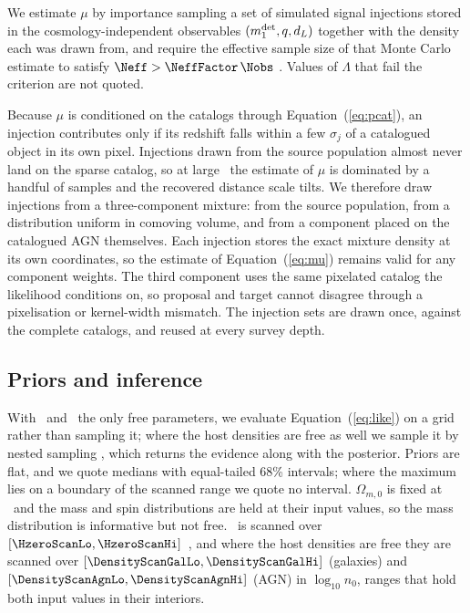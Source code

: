 We estimate $\mu$ by importance sampling a set of simulated signal injections
stored in the cosmology-independent observables
$(m_1^{\rm det}, q, d_L)$ together with the density each was drawn from, and
require the effective sample size of that Monte Carlo estimate to satisfy
$\Neff > \NeffFactor\,\Nobs$ \citep{Farr2019}. Values of $\Lambda$ that fail
the criterion are not quoted.

Because $\mu$ is conditioned on the catalogs through Equation~(\ref{eq:pcat}),
an injection contributes only if its redshift falls within a few $\sigma_j$ of
a catalogued object in its own pixel. Injections drawn from the source
population almost never land on the sparse catalog, so at large \fagn\ the
estimate of $\mu$ is dominated by a handful of samples and the recovered
distance scale tilts. We therefore draw injections from a three-component
mixture: from the source population, from a distribution uniform in comoving
volume, and from a component placed on the catalogued AGN themselves. Each
injection stores the exact mixture density at its own coordinates, so the
estimate of Equation~(\ref{eq:mu}) remains valid for any component weights. The
third component uses the same pixelated catalog the likelihood
conditions on, so proposal and target cannot disagree through a pixelisation or
kernel-width mismatch. The injection sets are drawn once, against the
complete catalogs, and reused at every survey depth.

\subsection{Priors and inference}
\label{sec:methods:inference}

With \Hz\ and \fagn\ the only free parameters, we evaluate
Equation~(\ref{eq:like}) on a grid rather than sampling it; where the host
densities are free as well we sample it by nested sampling
\citep{Speagle2020}, which returns the evidence along with the posterior. Priors are flat, and
we quote medians with equal-tailed 68\% intervals; where the maximum lies on a
boundary of the scanned range we quote no interval. $\Omega_{m,0}$ is fixed at
\OmZeroTruth\ and the mass and spin distributions are held at their input
values, so the mass distribution is informative but not free. \Hz\ is scanned
over $[\HzeroScanLo, \HzeroScanHi]$~\kmsmpc, and where the host densities are
free they are scanned over $[\DensityScanGalLo, \DensityScanGalHi]$
(galaxies) and $[\DensityScanAgnLo, \DensityScanAgnHi]$ (AGN) in
$\log_{10} n_0$, ranges that hold both input values in their interiors.
